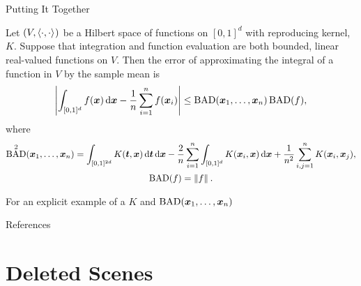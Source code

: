 \documentclass[10pt,compress,xcolor={usenames,dvipsnames},aspectratio=169]{beamer}
\DeclareMathOperator{\BAD}{BAD}
\begin{document}
\begin{frame}[label = KH]{Putting It Together}
	
	\vspace{-2ex}
	
	\begin{theorem} 
		Let $(V,\left \langle \cdot, \cdot \right \rangle_{{}})$ be a Hilbert space of functions on $[0,1]^d$ with reproducing kernel, $K$.  Suppose that integration and function evaluation are both bounded, linear real-valued functions on $V$.  Then the error of approximating the integral of a function in $V$ by the sample mean is
		\[
		\abs{\int_{[0,1]^d} f(\vx) \, \dif \vx - \frac 1n \sum_{i=1}^n f(\vx_i) }
		\le \BAD(\vx_1, \ldots, \vx_n) \BAD(f),
		\]
		where 
		\begin{gather*}
			\BAD^2(\vx_1, \ldots, \vx_n) =  \int_{[0,1]^{2d}} K(\vt,\vx) \, \dif \vt \, \dif \vx
			-  \frac 2n \sum_{i=1}^n \int_{[0,1]^d} K(\vx_i,\vx)  \, \dif \vx 
			+  \frac 1{n^2} \sum_{i,j=1}^n K(\vx_i,\vx_j) ,\\
			\BAD(f) = \norm{f}.
		\end{gather*}
		
	\end{theorem}
	
	\vspace{-2ex}
	For an explicit example of a $K$ and $\BAD(\vx_1, \ldots, \vx_n)$ \hyperlink{CDKH}{}
\end{frame}


\thankyouframe

\begin{frame}{References}
    \printbibliography
\end{frame}





\section{Deleted Scenes}
\end{document}
